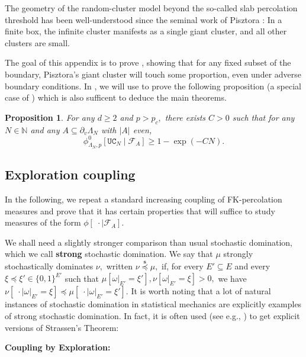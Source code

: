 \documentclass[article,11pt,reqno]{amsart}
\newtheorem{proposition}[theorem]{Proposition}
\begin{document}
\begin{appendix}
\label{sec:Pisztora_giant meets_the_boundary}
The geometry of the random-cluster model beyond the so-called slab percolation threshold has been well-understood since the seminal work of Pisztora \cite{Pis96}: In a finite box, the infinite cluster manifests as a single giant cluster, and all other clusters are small.

The goal of this appendix is to prove , showing that for any fixed subset of the boundary, Pisztora's giant cluster will touch some proportion, even under adverse boundary conditions. In , we will use  to prove the following proposition (a special case of ) which is also sufficent to deduce the main theorems. 


\begin{proposition}\label{proposition:unique_crossing_with_fa_old_version}
For any $d\geq 2$ and $p>p_c,$ there exists $C>0$ such that for any $N\in \mathbb{N}$ and any $A\subseteq \partial_v \Lambda_N$ with $|A|$ even,
$$
\phi^0_{\Lambda_N,p}[\mathtt{UC}_N\mid \mathcal{F}_A]\geq 1-\exp(-CN).
$$
\end{proposition}



\subsection{Exploration coupling}
In the following, we repeat a standard increasing coupling of FK-percolation measures and prove that it has certain properties that will suffice to study measures of the form $\phi[\;\cdot \mid \mathcal{F}_A]$.


We shall need a slightly stronger comparison than usual stochastic domination, which we call \textbf{strong} stochastic domination. We say that $\mu$ strongly stochastically dominates $\nu,$ written $\nu\overset{\mathbf{s}}{\preceq} \mu,$ if, for every $E'\subseteq E$ and every $\xi\preceq \xi'\in \{0,1\}^{E'}$ such that $\mu[\omega|_{E'}=\xi'],\nu[\omega|_{E'}=\xi]>0,$ we have $\nu[\;\cdot\mid \omega|_{E'}=\xi]\preceq \mu[\;\cdot \mid \omega|_{E'}=\xi'].$ It is worth noting that a lot of natural instances of stochastic domination in statistical mechanics are explicitly examples of strong stochastic domination. 
In fact, it is often used (see e.g., \cite[Proposition 2.6]{ScalingRelations}) to get explicit versions of Strassen's Theorem:

\vspace{0.3cm}
\begin{mdframed}[style=MyFrame]
\begin{center}
    \textbf{Coupling by Exploration:}
\end{center}


\end{mdframed}
\end{appendix}
\end{document}

